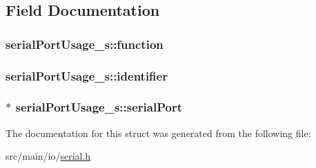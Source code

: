 \subsection{Field Documentation}
\hypertarget{structserialPortUsage__s_a782ced3de11e11bc132cf01f3d490d68}{
\subsubsection[{function}]{ serial\+Port\+Usage\+\_\+s\+::function}}\label{structserialPortUsage__s_a782ced3de11e11bc132cf01f3d490d68}
\hypertarget{structserialPortUsage__s_a3694c35349d1453f0b6949d2dc9a31d0}{
\subsubsection[{identifier}]{ serial\+Port\+Usage\+\_\+s\+::identifier}}\label{structserialPortUsage__s_a3694c35349d1453f0b6949d2dc9a31d0}
\hypertarget{structserialPortUsage__s_af40a0fbe2c079e2e30d9bffb8f410c65}{
\subsubsection[{serial\+Port}]{$\ast$ serial\+Port\+Usage\+\_\+s\+::serial\+Port}}\label{structserialPortUsage__s_af40a0fbe2c079e2e30d9bffb8f410c65}


The documentation for this struct was generated from the following file\+:\begin{DoxyCompactItemize}
\item 
src/main/io/\hyperlink{io_2serial_8h}{serial.\+h}\end{DoxyCompactItemize}
